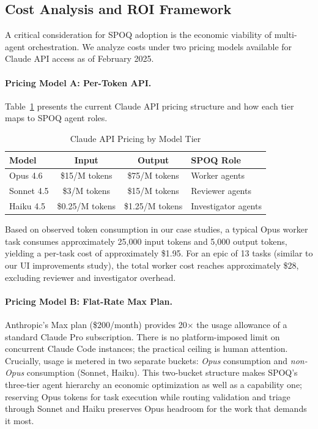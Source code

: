 \clearpage
\subsection{Cost Analysis and ROI Framework}
\label{subsec:cost-analysis-detail}

A critical consideration for SPOQ adoption is the economic viability of
multi-agent orchestration. We analyze costs under two pricing models
available for Claude API access as of February 2025.

\paragraph{Pricing Model A: Per-Token API.}
Table~\ref{tab:api-pricing} presents the current Claude API pricing structure
and how each tier maps to SPOQ agent roles.

\begin{table}[htbp]
\centering
\caption{Claude API Pricing by Model Tier}
\label{tab:api-pricing}
\begin{tabular}{lccl}
\toprule
\textbf{Model} & \textbf{Input} & \textbf{Output} & \textbf{SPOQ Role} \\
\midrule
Opus 4.6 & \$15/M tokens & \$75/M tokens & Worker agents \\
Sonnet 4.5 & \$3/M tokens & \$15/M tokens & Reviewer agents \\
Haiku 4.5 & \$0.25/M tokens & \$1.25/M tokens & Investigator agents \\
\bottomrule
\end{tabular}
\end{table}

Based on observed token consumption in our case studies, a typical Opus worker
task consumes approximately 25,000 input tokens and 5,000 output tokens,
yielding a per-task cost of approximately \$1.95. For an epic of 13 tasks
(similar to our UI improvements study), the total worker cost reaches
approximately \$28, excluding reviewer and investigator overhead.

\paragraph{Pricing Model B: Flat-Rate Max Plan.}
Anthropic's Max plan (\$200/month) provides 20$\times$ the usage allowance
of a standard Claude Pro subscription. There is no platform-imposed limit on
concurrent Claude Code instances; the practical ceiling is human attention.
Crucially, usage is metered in two separate buckets: \emph{Opus} consumption
and \emph{non-Opus} consumption (Sonnet, Haiku). This two-bucket structure
makes SPOQ's three-tier agent hierarchy an economic optimization as well as
a capability one; reserving Opus tokens for task execution while routing
validation and triage through Sonnet and Haiku preserves Opus headroom for
the work that demands it most.

